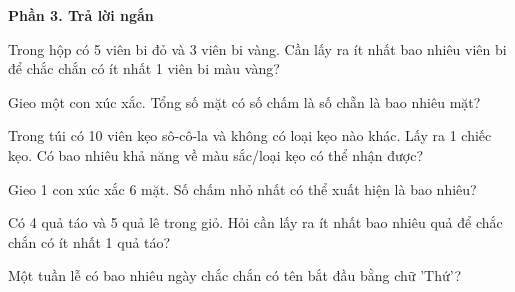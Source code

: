 \textbf{Phần 3. Trả lời ngắn}

\begin{ex} %
Trong hộp có 5 viên bi đỏ và 3 viên bi vàng. Cần lấy ra ít nhất bao nhiêu viên bi để chắc chắn có ít nhất 1 viên bi màu vàng?
\end{ex}

\begin{ex} %
Gieo một con xúc xắc. Tổng số mặt có số chấm là số chẵn là bao nhiêu mặt?
\end{ex}

\begin{ex} %
Trong túi có 10 viên kẹo sô-cô-la và không có loại kẹo nào khác. Lấy ra 1 chiếc kẹo. Có bao nhiêu khả năng về màu sắc/loại kẹo có thể nhận được?
\end{ex}

\begin{ex} %
Gieo 1 con xúc xắc 6 mặt. Số chấm nhỏ nhất có thể xuất hiện là bao nhiêu?
\end{ex}

\begin{ex} %
Có 4 quả táo và 5 quả lê trong giỏ. Hỏi cần lấy ra ít nhất bao nhiêu quả để chắc chắn có ít nhất 1 quả táo?
\end{ex}

\begin{ex} %
Một tuần lễ có bao nhiêu ngày chắc chắn có tên bắt đầu bằng chữ 'Thứ'?
\end{ex}
